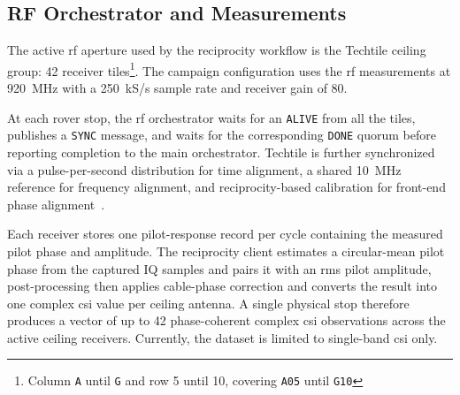 \subsection{RF Orchestrator and Measurements}

The active \gls{rf} aperture used by the reciprocity workflow is the Techtile ceiling group: 42 receiver tiles\footnote{
Column \texttt{A} until \texttt{G} and row 5 until 10, covering \texttt{A05} until \texttt{G10}}. The campaign configuration uses the \gls{rf} measurements at 920~MHz with a 250~kS/s sample rate and receiver gain of 80.  

At each rover stop, the \gls{rf} orchestrator waits for an \texttt{ALIVE}  from all the tiles, publishes a  \texttt{SYNC} message, and waits for the corresponding \texttt{DONE} quorum before reporting completion to the main orchestrator. Techtile is further synchronized via a pulse-per-second distribution for time alignment, a shared 10~MHz reference for frequency alignment, and reciprocity-based calibration for front-end phase alignment~\cite{syncWptTechtile}. 

Each receiver stores one pilot-response record per cycle containing the measured pilot phase and amplitude. The reciprocity client estimates a circular-mean pilot phase from the captured IQ samples and pairs it with an \gls{rms} pilot amplitude, post-processing then applies cable-phase correction and converts the result into one complex \gls{csi} value per ceiling antenna. A single physical stop therefore produces a vector of up to 42 phase-coherent complex \gls{csi} observations across the active ceiling receivers. Currently, the dataset is limited to single-band \gls{csi} only.

